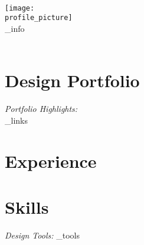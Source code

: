 \documentclass[a4paper,10pt]{article}
\begin{document}
\begin{center}
    \LARGE{\textbf{{\name}}} \\
    \texttt{[image: \\profile\_picture]} \\
    \small{{\contact_info}} \\
    \small{{\email}} \\
\end{center}

\vspace{0.3cm}

\section*{Design Portfolio}
\textit{Portfolio Highlights:} \\
{{\portfolio_links}}

\vspace{0.4cm}

\section*{Experience}

\vspace{0.3cm}

\section*{Skills}
\textit{Design Tools:} {{\design_tools}}
\end{document}
